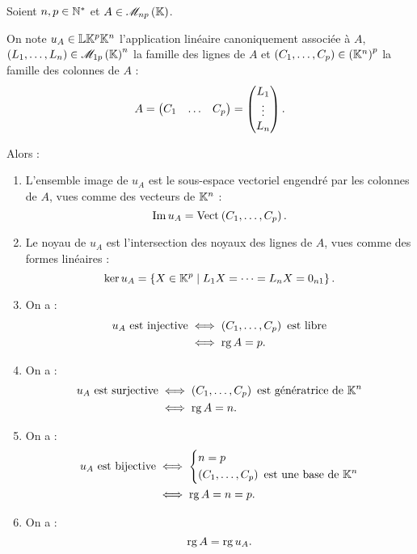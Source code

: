 \begin{rem}
Soient \(n,p\in\mathbb{N}^*\) et \(A\in\M{np}\).

On note \(u_A\in\mathbb{L}{\mathbb{K}^p}{\mathbb{K}^n}\) l'application linéaire canoniquement associée à \(A\), \(\paren{L_1,\dots,L_n}\in\M{1p}^n\) la famille des lignes de \(A\) et \(\left(C_1,\dots,C_p\right)\in\left(\mathbb{K}^n\right)^p\) la famille des colonnes de \(A\) : \[A=\begin{pmatrix}
C_1 & \dots & C_p
\end{pmatrix}=\begin{pmatrix}L_1\\\vdots\\L_n\end{pmatrix}.\]

Alors :

\begin{enumerate}
\item L'ensemble image de \(u_A\) est le sous-espace vectoriel engendré par les colonnes de \(A\), vues comme des vecteurs de \(\mathbb{K}^n\) : \[\Im u_A=\Vect{C_1,\dots,C_p}.\]

\item Le noyau de \(u_A\) est l'intersection des noyaux des lignes de \(A\), vues comme des formes linéaires : \[\ker u_A=\left\lbrace X\in\mathbb{K}^p\;\middle|\; L_1X=\dots=L_nX=0_{n1}\right\rbrace.\]

\item On a : \[\begin{aligned}
u_A\text{ est injective}&\iff\left(C_1,\dots,C_p\right)\text{ est libre} \\
&\iff\operatorname{rg} A=p.
\end{aligned}\]

\item On a : \[\begin{aligned}
u_A\text{ est surjective}&\iff\left(C_1,\dots,C_p\right)\text{ est génératrice de }\mathbb{K}^n \\
&\iff\operatorname{rg} A=n.
\end{aligned}\]

\item On a : \[\begin{aligned}
u_A\text{ est bijective}&\iff\begin{dcases}
n=p \\
\left(C_1,\dots,C_p\right)\text{ est une base de }\mathbb{K}^n
\end{dcases} \\
&\iff\operatorname{rg} A=n=p.
\end{aligned}\]

\item On a : \[\operatorname{rg} A=\operatorname{rg} u_A.\]
\end{enumerate}
\end{rem}


